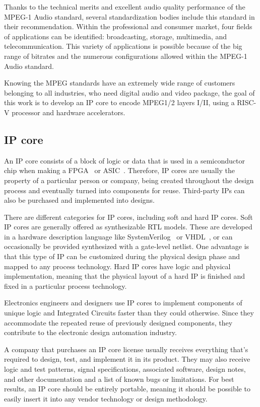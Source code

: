 Thanks to the technical merits and excellent audio quality performance of the MPEG-1 Audio standard, several standardization bodies include this standard in their recommendation.
Within the professional and consumer market, four fields of applications can be identified: broadcasting, storage, multimedia, and telecommunication. This variety of applications is possible because of the big range of bitrates and the numerous configurations allowed within the MPEG-1 Audio standard. 

Knowing the MPEG standards have an extremely wide range of customers belonging to all industries, who need digital audio and video package, the goal of this work is to develop an IP core to encode MPEG1/2 layers I/II, using a RISC-V processor and hardware accelerators.

\subsection{IP core}

An IP core consists of a block of logic or data that is used in a semiconductor chip when making a FPGA~\cite{fpga} or ASIC~\cite{asic}.
Therefore, IP cores are usually the property of a particular person or company, being created throughout the design process and eventually turned into components for reuse. Third-party IPs can also be purchased and implemented into designs. 

There are different categories for IP cores, including soft and hard IP cores.
Soft IP cores are generally offered as synthesizable RTL models. These are developed in a hardware description language like SystemVerilog~\cite{ieee:systemVerilog} or VHDL~\cite{ieee:vhdl}, or can occasionally be provided synthesized with a gate-level netlist. One advantage is that this type of IP can be customized during the physical design phase and mapped to any process technology.
Hard IP cores have logic and physical implementation, meaning that the physical layout of a hard IP is finished and fixed in a particular process technology.

Electronics engineers and designers use IP cores to implement components of unique logic and Integrated Circuits faster than they could otherwise. Since they accommodate the repeated reuse of previously designed components, they contribute to the electronic design automation industry.

A company that purchases an IP core license usually receives everything that's required to design, test, and implement it in its product. They may also receive logic and test patterns, signal specifications, associated software, design notes, and other documentation and a list of known bugs or limitations.
For best results, an IP core should be entirely portable, meaning it should be possible to easily insert it into any vendor technology or design methodology.

